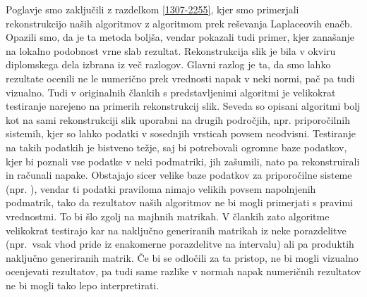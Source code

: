 Poglavje smo zaključili z razdelkom \ref{1307-2255}, kjer smo primerjali rekonstrukcijo naših algoritmov z algoritmom prek reševanja Laplaceovih enačb. Opazili smo, da je ta metoda boljša, vendar pokazali tudi primer, kjer zanašanje na lokalno podobnost vrne slab rezultat. Rekonstrukcija slik je bila v okviru diplomskega dela izbrana iz več razlogov. Glavni razlog je ta, da smo lahko rezultate ocenili ne le numerično prek vrednosti napak v neki normi, pač pa tudi vizualno. Tudi v originalnih člankih s predstavljenimi algoritmi je velikokrat testiranje narejeno na primerih rekonstrukcij slik.
Seveda so opisani algoritmi bolj kot na sami rekonstrukciji slik uporabni na drugih področjih, npr. priporočilnih sistemih, kjer so lahko podatki v sosednjih vrsticah povsem neodvisni. Testiranje na takih podatkih je bistveno težje, saj bi potrebovali ogromne baze podatkov, kjer bi poznali vse podatke v neki podmatriki, jih zašumili, nato pa rekonstruirali in računali napake. Obstajajo sicer velike baze podatkov za priporočilne sisteme (npr. \cite{reccData}), vendar ti podatki praviloma nimajo velikih povsem napolnjenih podmatrik, tako da rezultatov naših algoritmov ne bi mogli primerjati s pravimi vrednostmi. To bi šlo zgolj na majhnih matrikah. V člankih zato algoritme velikokrat testirajo kar na naključno generiranih matrikah iz neke porazdelitve (npr.\ vsak vhod pride iz enakomerne porazdelitve na intervalu) ali pa produktih naključno generiranih matrik. Če bi se odločili za ta pristop, ne bi mogli vizualno ocenjevati rezultatov, pa tudi same razlike v normah napak numeričnih rezultatov ne bi mogli tako lepo interpretirati.